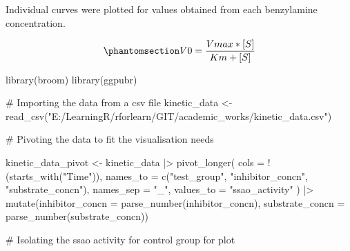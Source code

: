 \documentclass[
  letterpaper,
  DIV=11,
  numbers=noendperiod]{scrreprt}
\newenvironment{Shaded}{\begin{snugshade}}{\end{snugshade}}
\newcommand{\AttributeTok}[1]{\textcolor[rgb]{0.40,0.45,0.13}{#1}}
\newcommand{\CommentTok}[1]{\textcolor[rgb]{0.37,0.37,0.37}{#1}}
\newcommand{\FunctionTok}[1]{\textcolor[rgb]{0.28,0.35,0.67}{#1}}
\newcommand{\NormalTok}[1]{\textcolor[rgb]{0.00,0.23,0.31}{#1}}
\newcommand{\OtherTok}[1]{\textcolor[rgb]{0.00,0.23,0.31}{#1}}
\newcommand{\SpecialCharTok}[1]{\textcolor[rgb]{0.37,0.37,0.37}{#1}}
\newcommand{\StringTok}[1]{\textcolor[rgb]{0.13,0.47,0.30}{#1}}
\begin{document}
Individual curves were plotted for values obtained from each benzylamine
concentration.

\begin{equation}\phantomsection\label{eq-mm}{
{V0} = \frac{Vmax * [S]}{Km + [S]}
}\end{equation}

\begin{Shaded}
\begin{Highlighting}[]
\FunctionTok{library}\NormalTok{(broom)}
\FunctionTok{library}\NormalTok{(ggpubr)}

\CommentTok{\# Importing the data from a csv file}
\NormalTok{kinetic\_data }\OtherTok{\textless{}{-}} \FunctionTok{read\_csv}\NormalTok{(}\StringTok{"E:/LearningR/rforlearn/GIT/academic\_works/kinetic\_data.csv"}\NormalTok{)}

\CommentTok{\# Pivoting the data to fit the visualisation needs}

\NormalTok{kinetic\_data\_pivot }\OtherTok{\textless{}{-}}\NormalTok{ kinetic\_data }\SpecialCharTok{|\textgreater{}} 
  \FunctionTok{pivot\_longer}\NormalTok{(}
    \AttributeTok{cols =} \SpecialCharTok{!}\NormalTok{(}\FunctionTok{starts\_with}\NormalTok{(}\StringTok{"Time"}\NormalTok{)),}
    \AttributeTok{names\_to =} \FunctionTok{c}\NormalTok{(}\StringTok{"test\_group"}\NormalTok{, }\StringTok{"inhibitor\_concn"}\NormalTok{, }\StringTok{"substrate\_concn"}\NormalTok{),}
    \AttributeTok{names\_sep =} \StringTok{"\_"}\NormalTok{,}
    \AttributeTok{values\_to =} \StringTok{"ssao\_activity"}
\NormalTok{  ) }\SpecialCharTok{|\textgreater{}} \FunctionTok{mutate}\NormalTok{(}\AttributeTok{inhibitor\_concn =} \FunctionTok{parse\_number}\NormalTok{(inhibitor\_concn),}
              \AttributeTok{substrate\_concn =} \FunctionTok{parse\_number}\NormalTok{(substrate\_concn))}

\CommentTok{\# Isolating the ssao activity for control group for plot}


\end{Highlighting}
\end{Shaded}
\end{document}
